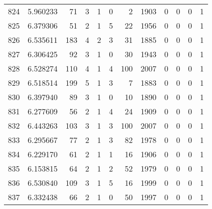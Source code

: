\begin{tabular}{lrrrrrrrrrrr}
824 &  5.960233 &   71 &      3 &        1 &      0 &               2 &  1903 &               0 &               0 &               0 &               1 \\
825 &  6.379306 &   51 &      2 &        1 &      5 &              22 &  1956 &               0 &               0 &               0 &               1 \\
826 &  6.535611 &  183 &      4 &        2 &      3 &              31 &  1885 &               0 &               0 &               0 &               1 \\
827 &  6.306425 &   92 &      3 &        1 &      0 &              30 &  1943 &               0 &               0 &               0 &               1 \\
828 &  6.528274 &  110 &      4 &        1 &      4 &             100 &  2007 &               0 &               0 &               0 &               1 \\
829 &  6.518514 &  199 &      5 &        1 &      3 &               7 &  1883 &               0 &               0 &               0 &               1 \\
830 &  6.397940 &   89 &      3 &        1 &      0 &              10 &  1890 &               0 &               0 &               0 &               1 \\
831 &  6.277609 &   56 &      2 &        1 &      4 &              24 &  1909 &               0 &               0 &               0 &               1 \\
832 &  6.443263 &  103 &      3 &        1 &      3 &             100 &  2007 &               0 &               0 &               0 &               1 \\
833 &  6.295667 &   77 &      2 &        1 &      3 &              82 &  1978 &               0 &               0 &               0 &               1 \\
834 &  6.229170 &   61 &      2 &        1 &      1 &              16 &  1906 &               0 &               0 &               0 &               1 \\
835 &  6.153815 &   64 &      2 &        1 &      2 &              52 &  1979 &               0 &               0 &               0 &               1 \\
836 &  6.530840 &  109 &      3 &        1 &      5 &              16 &  1999 &               0 &               0 &               0 &               1 \\
837 &  6.332438 &   66 &      2 &        1 &      0 &              50 &  1997 &               0 &               0 &               0 &               1 \\

\end{tabular}

